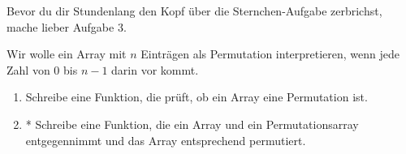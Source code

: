 \noindent Bevor du dir Stundenlang den Kopf über die Sternchen-Aufgabe zerbrichst, mache lieber Aufgabe 3.

\begin{aufg} Wir wolle ein Array mit $n$ Einträgen als Permutation interpretieren, wenn jede Zahl von $0$ bis $n-1$ darin vor kommt.
\begin{enumerate}
\item Schreibe eine Funktion, die prüft, ob ein Array eine Permutation ist.
\item * Schreibe eine Funktion, die ein Array und ein Permutationsarray entgegennimmt und das Array entsprechend permutiert.
\end{enumerate}
\end{aufg}

